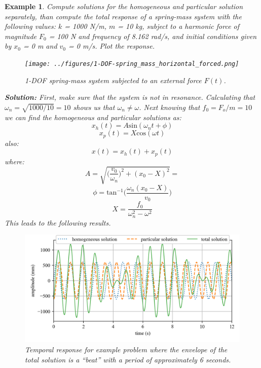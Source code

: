 \documentclass[12pt,letter]{article}
\newtheorem{ex}{Example}
\numberwithin{ex}{section} %
\newenvironment{example}{\begin{mdframed}[middlelinewidth=0.5mm]\begin{ex}\normalfont}{\end{ex}\end{mdframed}}
\numberwithin{re}{section} %
\numberwithin{pr}{section} %
\begin{document}
\begin{example}

			Compute solutions for the homogeneous and particular solution separately, than compute the total response of a spring-mass system with the following values: $k$ = 1000 N/m, $m$ = 10 kg, subject to a harmonic force of magnitude $F_0$ = 100 N and frequency of 8.162 rad/s, and initial conditions given by $x_0$ = 0 m and $v_0$ = 0 m/s. Plot the response.
			
			\begin{figure}[H]
				\centering
				\texttt{[image: ../figures/1-DOF-spring\_mass\_horizontal\_forced.png]}
				\caption{1-DOF spring-mass system subjected to an external force $F(t)$.}
			\end{figure}
			
			\noindent\textbf{Solution:} First, make sure that the system is not in resonance. Calculating that $\omega_n = \sqrt{1000/10} = 10$ shows us that $\omega_n \neq \omega$. Next knowing that $f_0 = F_o/m = 10$ we can find the homogeneous and particular solutions as:
			\begin{equation}
				x_h(t) = A\text{sin}(\omega_n t + \phi)
			\end{equation}				
			\begin{equation}
				x_p(t) = X\text{cos}(\omega t) 
			\end{equation}	
			also:			
			\begin{equation}
				x(t) = x_h(t) + x_p(t)
			\end{equation}	
			where:			
			\begin{equation}
				A = \sqrt{\bigg(\frac{v_0}{\omega_n}\bigg)^2+(x_0-X)^2} = 
			\end{equation}				
			\begin{equation}
				\phi = \text{tan}^{-1}\bigg(\frac{\omega_n(x_0-X)}{v_0}\bigg)
			\end{equation}				
			\begin{equation}
				X = \frac{f_0}{\omega_n^2-\omega^2}
			\end{equation}			
			This leads to the following results. 
			\begin{figure}[H]
				\centering
				\includegraphics[]{../figures/homogeneous_and_particular_solutions.png}
				\caption{Temporal response for example problem where the envelope of the total solution is a ``beat'' with a period of approximately 6 seconds.}
			\end{figure}			

\end{example}
\end{document}
